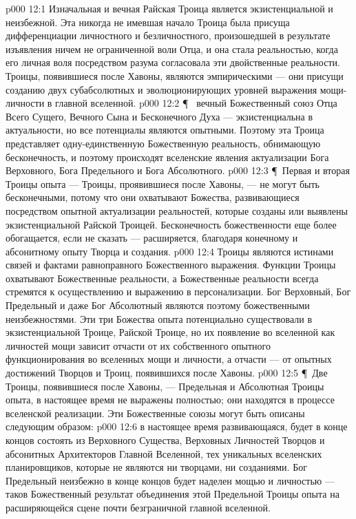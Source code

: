 \vs p000 12:1 Изначальная и вечная Райская Троица является экзистенциальной и неизбежной. Эта никогда не имевшая начало Троица была присуща дифференциации личностного и безличностного, произошедшей в результате изъявления ничем не ограниченной воли Отца, и она стала реальностью, когда его личная воля посредством разума согласовала эти двойственные реальности. Троицы, появившиеся после Хавоны, являются эмпирическими --- они присущи созданию двух субабсолютных и эволюционирующих уровней выражения мощи\hyp{}личности в главной вселенной.
\vs p000 12:2 \P\  вечный Божественный союз Отца Всего Сущего, Вечного Сына и Бесконечного Духа --- экзистенциальна в актуальности, но все потенциалы являются опытными. Поэтому эта Троица представляет одну\hyp{}единственную Божественную реальность, обнимающую бесконечность, и поэтому происходят вселенские явления актуализации Бога Верховного, Бога Предельного и Бога Абсолютного.
\vs p000 12:3 \P\ Первая и вторая Троицы опыта --- Троицы, проявившиеся после Хавоны, --- не могут быть бесконечными, потому что они охватывают  Божества, развивающиеся посредством опытной актуализации реальностей, которые созданы или выявлены экзистенциальной Райской Троицей. Бесконечность божественности еще более обогащается, если не сказать --- расширяется, благодаря конечному и абсонитному опыту Творца и создания.
\vs p000 12:4 Троицы являются истинами связей и фактами равноправного Божественного выражения. Функции Троицы охватывают Божественные реальности, а Божественные реальности всегда стремятся к осуществлению и выражению в персонализации. Бог Верховный, Бог Предельный и даже Бог Абсолютный являются поэтому божественными неизбежностями. Эти три Божества опыта потенциально существовали в экзистенциальной Троице, Райской Троице, но их появление во вселенной как личностей мощи зависит отчасти от их собственного опытного функционирования во вселенных мощи и личности, а отчасти --- от опытных достижений Творцов и Троиц, появившихся после Хавоны.
\vs p000 12:5 \P\ Две Троицы, появившиеся после Хавоны, --- Предельная и Абсолютная Троицы опыта, в настоящее время не выражены полностью; они находятся в процессе вселенской реализации. Эти Божественные союзы могут быть описаны следующим образом:
\vs p000 12:6 \bibnobreakspace {} в настоящее время развивающаяся, будет в конце концов состоять из Верховного Существа, Верховных Личностей Творцов и абсонитных Архитекторов Главной Вселенной, тех уникальных вселенских планировщиков, которые не являются ни творцами, ни созданиями. Бог Предельный неизбежно в конце концов будет наделен мощью и личностью --- таков Божественный результат объединения этой Предельной Троицы опыта на расширяющейся сцене почти безграничной главной вселенной.

